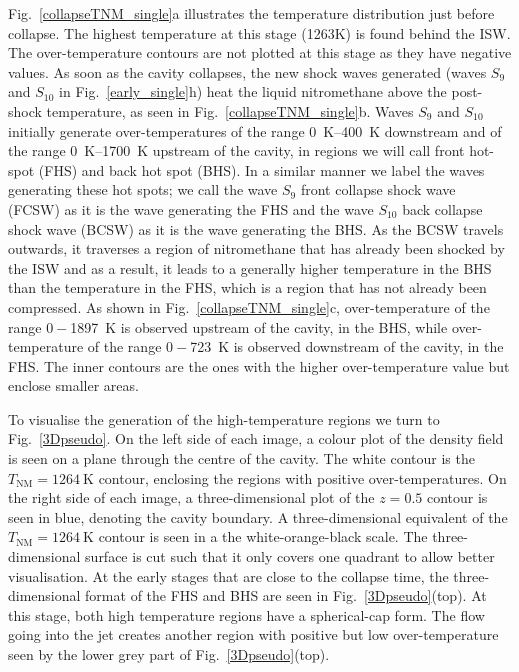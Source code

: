 \documentclass[3p,times,twocolumn]{elsarticle}
\begin{document}
 Fig.\  \ref{collapseTNM_single}a illustrates the temperature distribution
just before collapse. The highest temperature at this stage (1263K) is found
behind the ISW. The over-temperature contours are not plotted at this stage
as they have negative values. As soon as the cavity collapses, the new shock
waves generated (waves $S_9$ and $S_{10}$ in Fig.\  \ref{early_single}h)
heat the liquid nitromethane above the post-shock temperature, as seen in
Fig.\  \ref{collapseTNM_single}b. Waves $S_9$ and $S_{10}$ initially generate
over-temperatures of the range \SI{0}{\kelvin}--\SI{400}{\kelvin} downstream
and  of the range \SI{0}{\kelvin}--\SI{1700}{\kelvin} upstream of the cavity,
in regions we will call front hot-spot (FHS) and back hot spot (BHS). In a similar manner we label
the waves generating these hot spots; we call the wave $S_9$ front collapse shock wave (FCSW) as it is the wave generating the FHS and the wave $S_{10}$ back collapse shock wave (BCSW) as it is the wave generating the BHS.
As the BCSW travels outwards, it traverses a region of nitromethane that has already
been shocked by the ISW and as a result, it leads to a generally higher temperature
in the BHS than  the temperature  in the FHS, which is a region that has
not already  been compressed.  As shown in  Fig.\  \ref{collapseTNM_single}c,
over-temperature of the range $0-$\SI{1897}{\kelvin} is observed upstream
of the cavity, in the BHS, while over-temperature of the range $0-$\SI{723}{\kelvin}
 is observed downstream of the cavity, in the FHS. The inner contours are
the ones with the higher over-temperature value but enclose smaller areas.

To visualise the generation of the high-temperature regions we turn to Fig.\ \ref{3Dpseudo}. On the left side of each image, a colour plot of the density field is seen on a plane through the centre of the cavity. The white contour is the $T_{\text{NM}}=\SI{1264}{\kelvin}$ contour, enclosing the regions with positive over-temperatures. On the right side of each image, a three-dimensional plot of the $z=0.5$ contour is seen in blue, denoting the cavity boundary. A three-dimensional equivalent of the  $T_{\text{NM}}=\SI{1264}{\kelvin}$ contour is seen in a the white-orange-black scale. The three-dimensional surface is cut such that it only covers one quadrant to allow better visualisation. At the early stages that are close to the collapse time, the three-dimensional format of the FHS and BHS are seen in Fig.\ \ref{3Dpseudo}(top). At this stage, both high temperature regions have a spherical-cap form. The flow going into the jet creates another region with positive but low over-temperature seen by the lower grey part of  Fig.\ \ref{3Dpseudo}(top).
\end{document}
